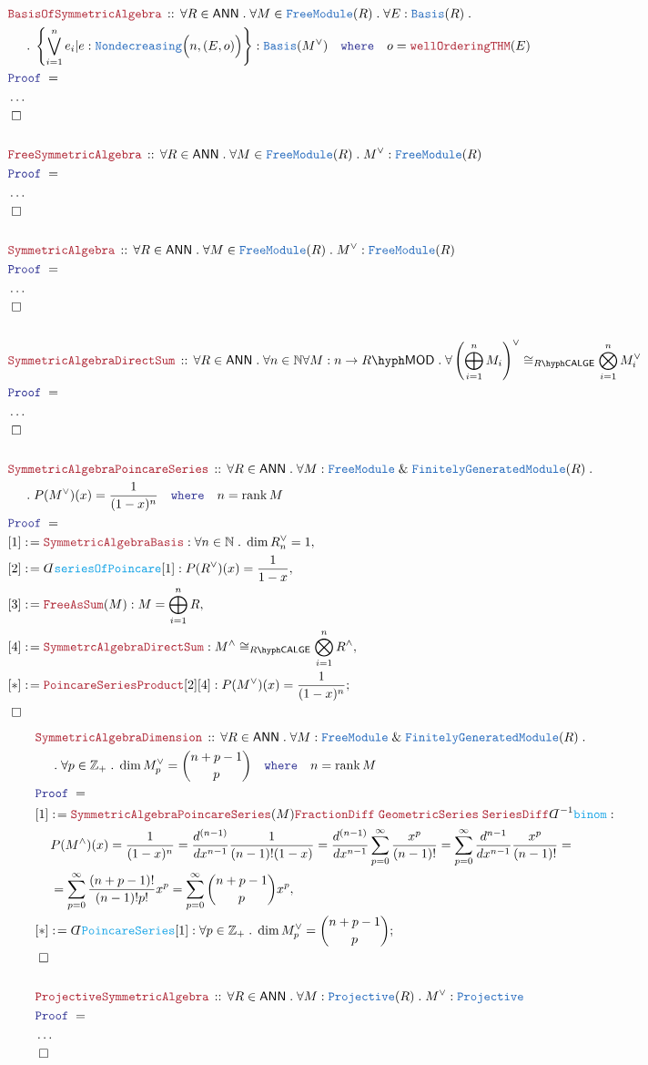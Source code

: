 \documentclass[12pt]{scrartcl}%
\newcommand{\TYPE}[1]{\textcolor{NavyBlue}{\mathtt{#1}}}%
\newcommand{\FUNC}[1]{\textcolor{Cerulean}{\mathtt{#1}}}%
\newcommand{\LOGIC}[1]{\textcolor{Blue}{\mathtt{#1}}}%
\newcommand{\THM}[1]{\textcolor{Maroon}{\mathtt{#1}}}%
\renewcommand{\.}{\; . \;} %
\newcommand{\de}{: \kern 0.1pc =} %
\newcommand{\where}{\LOGIC{where}} %
\newcommand{\Theorem}[2]{& \THM{#1} \, :: \, #2 \\ & \Proof = \\ } %
\newcommand{\NewLine}{\\ & \kern 1pc}%
\newcommand{\Page}[1]{ \begin{align*} #1 \end{align*}  }%
\newcommand{ \bd }{ \ByDef }%
\newcommand{\NoProof}{ & \ldots \\ \EndProof}%
\renewcommand{\And}{\; \& \;}%
\newcommand{\Int}{\mathbb{Z}}%
\newcommand{\Nat}{\mathbb{N}}%
\newcommand{\Say}[3]{& #1 \de #2 : #3, \\} %
\newcommand{\Conclude}[3]{& #1 \de #2 : #3; \\}%
\newcommand{\QED}{\; \square} %
\newcommand{\EndProof}{& \QED \\} %
\newcommand{\ByDef}{\rotatebox[origin=c]{-180}{$D$}}%
\newcommand{\Proof}{\LOGIC{Proof} \; } %
\DeclareMathOperator{\rank}{rank} %
\newcommand{\Basis}{\TYPE{Basis}} %
\newcommand{\FGM}{\TYPE{FinitelyGeneratedModule}}%
\newcommand{\FM}{\TYPE{FreeModule}}
\newcommand{\LMOD}[1]{#1\hyph\mathsf{MOD}} %
\newcommand{\ANN}{\mathsf{ANN}} %
\newcommand{\LCALGE}[1]{#1\hyph\mathsf{CALGE}}%
\begin{document}
\Page{
	\Theorem{BasisOfSymmetricAlgebra}
	{
		\forall R \in \ANN \. 
		\forall M \in \FM(R) \. 
		\forall E : \Basis(R) \. \NewLine \. 
		\left\{  \bigvee^n_{i=1} e_i | e : \TYPE{Nondecreasing}\Big(n,(E,o)\Big)  \right\} : \TYPE{Basis}(M^\vee)
		\quad \where \quad  o = \THM{wellOrderingTHM}(E)
	}
	\NoProof
	\\
	\Theorem{FreeSymmetricAlgebra}
	{
		\forall R \in \ANN \.
		\forall M \in \FM(R) \. 
		M^{\vee} : \FM(R) 
	}
	\NoProof
	\\
	\Theorem{SymmetricAlgebra}
	{
		\forall R \in \ANN \.
		\forall M \in \FM(R) \. 
		M^{\vee} : \FM(R) 
	}
	\NoProof
	\\
	\Theorem{SymmetricAlgebraDirectSum}
	{
		\forall R \in \ANN \. 
		\forall n \in \Nat
		\forall M : n \to \LMOD{R} \. 
		\forall \left( \bigoplus^n_{i=1} M_i  \right)^\vee \cong_{\LCALGE{R}}  \bigotimes^n_{i=1} M_i^\vee 
	}
	\NoProof
	\\
	\Theorem{SymmetricAlgebraPoincareSeries}
	{
		\forall R \in \ANN \.
		\forall M : \FM \And \FGM(R) \. \NewLine \.
		P(M^\vee)(x) =  \frac{1}{(1 - x)^n}  \quad \where \quad n = \rank M  
	}
	\Say{[1]}{\THM{SymmetricAlgebraBasis}}{\forall n \in \Nat \. \dim R^\vee_n = 1}
	\Say{[2]}{\bd \FUNC{seriesOfPoincare}[1]}{P(R^\vee)(x) = \frac{1}{1 - x}}
	\Say{[3]}{\THM{FreeAsSum}(M)}{M = \bigoplus^n_{i=1} R}
	\Say{[4]}{\THM{SymmetrcAlgebraDirectSum}}{ M^\wedge \cong_{\LCALGE{R}} \bigotimes^n_{i=1} R^\wedge }
	\Conclude{[*]}{\THM{PoincareSeriesProduct}[2][4]}{P(M^\vee)(x) = \frac{1}{(1-x)^n}}
	\EndProof
}\Page{
	\Theorem{SymmetricAlgebraDimension}
	{
		\forall R \in \ANN \. 
		\forall M : \FM \And \FGM(R) \. \NewLine \.
		\forall p \in \Int_+ \. 
		\dim M^\vee_p = \binom{n+p-1}{p}           
		\quad \where \quad n = \rank M 
	}
	\Say{[1]}{\THM{SymmetricAlgebraPoincareSeries}(M)\THM{FractionDiff}\;\THM{GeometricSeries}\;\THM{SeriesDiff}\bd^{-1}\FUNC{binom} }
	{
		\NewLine
		P(M^\wedge)(x) =
		\frac{1}{(1-x)^n} = 
		\frac{d^{(n-1)}}{dx^{n-1}} \frac{1}{(n-1)!(1-x)} = 
		\frac{d^{(n-1)}}{dx^{n-1}} \sum^\infty_{p=0}   \frac{x^p}{(n-1)!}  =
		\sum^\infty_{p=0} \frac{d^{n-1}}{dx^{n-1}}  \frac{x^p}{(n-1)!} = \NewLine =  
		\sum^{\infty}_{p=0} \frac{(n+p-1)!}{ (n-1)! p!  } x^p = 
		\sum^{\infty}_{p=0} \binom{n+p-1}{p} x^p
	}
	\Conclude{[*]}{\bd \FUNC{PoincareSeries}[1] }{ \forall p \in \Int_+ \. \dim M^\vee_p = \binom{n+p-1}{p} }
	\EndProof
	\\
	\Theorem{ProjectiveSymmetricAlgebra}{
		\forall R \in \ANN \. 
		\forall M : \TYPE{Projective}(R) \.
		 M^\vee : \TYPE{Projective} 
	}
	\NoProof
	\\
}
\end{document}
